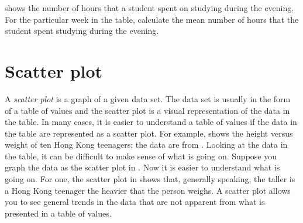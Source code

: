 \documentclass[a4paper,oneside,12pt]{article}
\begin{document}
\begin{exercise}
 shows the number of hours that a student spent
on studying during the evening.  For the particular week in the table,
calculate the mean number of hours that the student spent studying
during the evening.
\end{exercise}



\section{Scatter plot}

A \emph{scatter plot} is a graph of a given data set.  The data set is
usually in the form of a table of values and the scatter plot is a
visual representation of the data in the table.  In many cases, it is
easier to understand a table of values if the data in the table are
represented as a scatter plot.  For example, 
shows the height versus weight of ten Hong Kong teenagers; the data
are from .  Looking at the data in the table, it can
be difficult to make sense of what is going on.  Suppose you graph the
data as the scatter plot in .
Now it is easier to understand what is going on.  For one, the scatter
plot in  shows that, generally
speaking, the taller is a Hong Kong teenager the heavier that the
person weighs.  A scatter plot allows you to see general trends in the
data that are not apparent from what is presented in a table of
values.

\begin{table}[!htbp]
\centering

\caption{%
  The height and weight of ten Hong Kong teenagers.  Height is
  measured in centimetres and weight is measured in kilograms.
}
\label{tab:height_weight}
\end{table}
\end{document}
